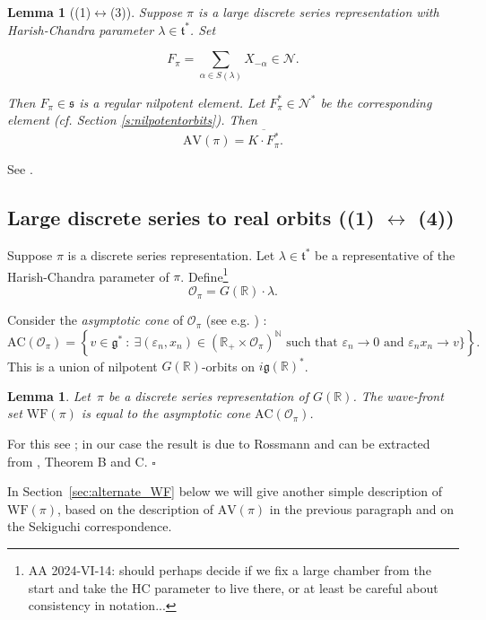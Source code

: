 \documentclass[10pt,leqno]{article}
\newtheorem{lemma}[equation]{Lemma}
\newcommand{\qed}{\hfill $\square$ \medskip}
\newcommand{\R}{\mathbb R}
\newcommand{\N}{\mathcal N}
\renewcommand{\t}{\mathfrak t}
\newcommand{\g}{\mathfrak g}
\newcommand{\s}{\mathfrak s}
\newcommand{\AV}{\mathrm{AV}}
\newcommand{\WF}{\mathrm{WF}}
\newcommand{\AC}{\mathrm{AC}}
\begin{document}
\begin{lemma}[(1)$\leftrightarrow$(3)]\label{l:pi_to_av}
Suppose $\pi$ is a large discrete series representation with Harish-Chandra parameter $\lambda\in\t^*$.
Set

\begin{equation}
  \label{e:Fpi}
  F_\pi=\sum_{\alpha\in S(\lambda)}X_{-\alpha}\in \N.
\end{equation}

Then $F_\pi\in\s$ is a regular nilpotent element. Let $F_\pi^\ast\in \N^*$ be the corresponding element (cf. Section \ref{s:nilpotentorbits}).
Then 
$$
\AV(\pi)=\overline{K\cdot F_\pi^\ast}.
$$
\end{lemma}

See
\cite[Propositions A.7 and A.9]{AV1}.


\subsection{Large discrete series to real orbits ((1) $\leftrightarrow$ (4))}\label{sec:asymp_cone}


Suppose $\pi$ is a discrete series representation. Let $\lambda\in\t^*$ be a representative of the Harish-Chandra parameter of $\pi$.
Define\footnote{AA 2024-VI-14: should perhaps decide if we fix a large chamber from the start and take the HC parameter to live there, or at least be careful about consistency in notation...}
\begin{equation} \label{semisimple_orbit_HC} \mathcal{O}_{\pi}=G(\R)\cdot\lambda.\end{equation}

Consider the \emph{asymptotic cone} of $\mathcal{O}_\pi$ (see e.g. \cite[Section 3]{AVAV}) :
\[ \AC(\mathcal{O}_\pi) = \left\{ v \in \g^* \ : \ \text{$\exists (\varepsilon_n, x_n)\in (\R_+ \times \mathcal{O}_\pi)^\mathbb{N}$ such that $\varepsilon_n \to 0$ and $\varepsilon_n x_n \to v$}\}  \right\}. \]
This is a union of nilpotent $G(\R)$-orbits on $i\g(\R)^*$.

\begin{lemma} \label{lem:WF_and_AC}
Let~$\pi$ be a discrete series representation of $G(\R)$. The wave-front set $\WF(\pi)$ is equal to the asymptotic cone $\AC(\mathcal{O}_\pi)$.
\end{lemma}

For this see \cite{HarrisHeOlafsson}; in our case the result is due to Rossmann and can be extracted from \cite{RossmannPicard}, Theorem B and C. \qed

In Section~\ref{sec:alternate_WF} below we will  give another simple description of~$\WF(\pi)$, based on the description of $\AV(\pi)$ in the previous paragraph and on the Sekiguchi correspondence. 
\end{document}
